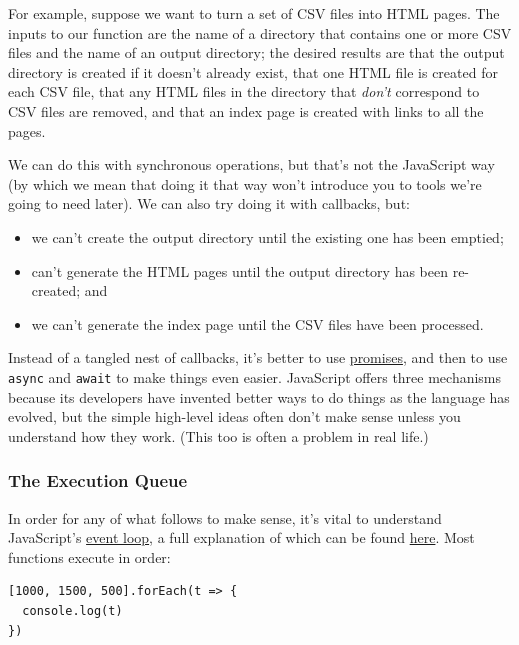 For example, suppose we want to turn a set of CSV files into HTML pages.
The inputs to our function are the name of a directory that contains one
or more CSV files and the name of an output directory; the desired
results are that the output directory is created if it doesn't already
exist, that one HTML file is created for each CSV file, that any HTML
files in the directory that \emph{don't} correspond to CSV files are
removed, and that an index page is created with links to all the pages.

We can do this with synchronous operations, but that's not the
JavaScript way (by which we mean that doing it that way won't introduce
you to tools we're going to need later). We can also try doing it with
callbacks, but:

\begin{itemize}
\tightlist
\item
  we can't create the output directory until the existing one has been
  emptied;
\item
  can't generate the HTML pages until the output directory has been
  re-created; and
\item
  we can't generate the index page until the CSV files have been
  processed.
\end{itemize}

Instead of a tangled nest of callbacks, it's better to use
\protect\hyperlink{g:promise}{promises}, and then to use \texttt{async}
and \texttt{await} to make things even easier. JavaScript offers three
mechanisms because its developers have invented better ways to do things
as the language has evolved, but the simple high-level ideas often don't
make sense unless you understand how they work. (This too is often a
problem in real life.)

\subsubsection{The Execution Queue}\label{s:promises-queue}

In order for any of what follows to make sense, it's vital to understand
JavaScript's \protect\hyperlink{g:event-loop}{event loop}, a full
explanation of which can be found
\href{https://nodejs.org/en/docs/guides/event-loop-timers-and-nexttick/}{here}.
Most functions execute in order:

\begin{verbatim}
[1000, 1500, 500].forEach(t => {
  console.log(t)
})
\end{verbatim}

